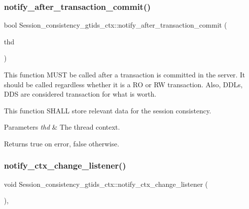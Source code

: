 \subsubsection{\texorpdfstring{notify\+\_\+after\+\_\+transaction\+\_\+commit()}{notify\_after\_transaction\_commit()}}
{\footnotesize\ttfamily bool Session\+\_\+consistency\+\_\+gtids\+\_\+ctx\+::notify\+\_\+after\+\_\+transaction\+\_\+commit (\begin{DoxyParamCaption}\item[{const T\+HD $\ast$}]{thd }\end{DoxyParamCaption})\hspace{0.3cm}{\ttfamily [virtual]}}

This function M\+U\+ST be called after a transaction is committed in the server. It should be called regardless whether it is a RO or RW transaction. Also, D\+D\+Ls, D\+DS are considered transaction for what is worth.

This function S\+H\+A\+LL store relevant data for the session consistency.


\begin{DoxyParams}{Parameters}
{\em thd} & The thread context. \\
\hline
\end{DoxyParams}
\begin{DoxyReturn}{Returns}
true on error, false otherwise. 
\end{DoxyReturn}
\mbox{\label{classSession__consistency__gtids__ctx_a8b315d4cb250e3ac1203e2498ecda698}} 
\subsubsection{\texorpdfstring{notify\+\_\+ctx\+\_\+change\+\_\+listener()}{notify\_ctx\_change\_listener()}}
{\footnotesize\ttfamily void Session\+\_\+consistency\+\_\+gtids\+\_\+ctx\+::notify\+\_\+ctx\+\_\+change\+\_\+listener (\begin{DoxyParamCaption}{ }\end{DoxyParamCaption})\hspace{0.3cm}{\ttfamily [inline]}, {\ttfamily [protected]}}

